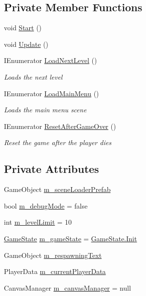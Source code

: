 \subsection*{Private Member Functions}
\begin{DoxyCompactItemize}
\item 
void \mbox{\hyperlink{class_game_manager_a5ccfacd027ad08eeb4ff1f25a7f59c98}{Start}} ()
\item 
void \mbox{\hyperlink{class_game_manager_a44c79b205dec16bfe650e21259860c5b}{Update}} ()
\item 
I\+Enumerator \mbox{\hyperlink{class_game_manager_a5b92f7fbdd78acc3576b9f8fa83a7f6b}{Load\+Next\+Level}} ()
\begin{DoxyCompactList}\small\item\em Loads the next level \end{DoxyCompactList}\item 
I\+Enumerator \mbox{\hyperlink{class_game_manager_a5c23fa91837ebfc3f114e315ee4a0623}{Load\+Main\+Menu}} ()
\begin{DoxyCompactList}\small\item\em Loads the main menu scene \end{DoxyCompactList}\item 
I\+Enumerator \mbox{\hyperlink{class_game_manager_a4d01c563f63394c879c458b8449967a0}{Reset\+After\+Game\+Over}} ()
\begin{DoxyCompactList}\small\item\em Reset the game after the player dies \end{DoxyCompactList}\end{DoxyCompactItemize}
\subsection*{Private Attributes}
\begin{DoxyCompactItemize}
\item 
Game\+Object \mbox{\hyperlink{class_game_manager_afe830d016f2ae2f5b74e792bcd957cb4}{m\+\_\+scene\+Loader\+Prefab}}
\item 
bool \mbox{\hyperlink{class_game_manager_a7aed1c66e288d6712e7b04c12bd0d5cc}{m\+\_\+debug\+Mode}} = false
\item 
int \mbox{\hyperlink{class_game_manager_a8166d596fca625618a2b5ab261b07659}{m\+\_\+level\+Limit}} = 10
\item 
\mbox{\hyperlink{_game_manager_8cs_a7899b65f1ea0f655e4bbf8d2a5714285}{Game\+State}} \mbox{\hyperlink{class_game_manager_a17e003b42eb6c99308a04813e359ff71}{m\+\_\+game\+State}} = \mbox{\hyperlink{_game_manager_8cs_a7899b65f1ea0f655e4bbf8d2a5714285a95b19f7739b0b7ea7d6b07586be54f36}{Game\+State.\+Init}}
\item 
Game\+Object \mbox{\hyperlink{class_game_manager_a0fed6d237d49a6a342b35a4423e6c03d}{m\+\_\+respawning\+Text}}
\item 
Player\+Data \mbox{\hyperlink{class_game_manager_a8e671c2fc013be135ec70b43aea3a29e}{m\+\_\+current\+Player\+Data}}
\item 
Canvas\+Manager \mbox{\hyperlink{class_game_manager_ad3abeb539c4f257789aa7134c752c786}{m\+\_\+canvas\+Manager}} = null
\end{DoxyCompactItemize}


